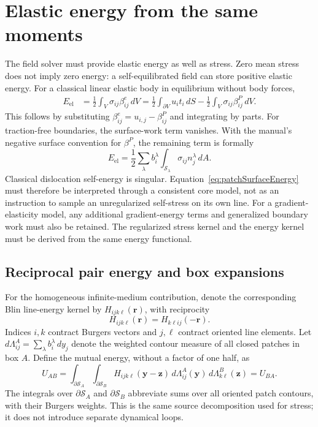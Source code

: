 \section{Elastic energy from the same moments}
\label{sec:patchMultipoleEnergy}
The field solver must provide elastic energy as well as stress. Zero mean stress does not imply zero energy: a self-equilibrated field can store positive elastic energy. For a classical linear elastic body in equilibrium without body forces,
\begin{align}
 E_{\mathrm{el}}&=\frac12\int_V\sigma_{ij}\beta^e_{ij}\,dV
 =\frac12\int_{\partial V}u_i t_i\,dS
 -\frac12\int_V\sigma_{ij}\beta^P_{ij}\,dV.
 \label{eq:patchEnergyWork}
\end{align}
This follows by substituting $\beta^e_{ij}=u_{i,j}-\beta^P_{ij}$ and integrating by parts. For traction-free boundaries, the surface-work term vanishes. With the manual's negative surface convention for $\beta^P$, the remaining term is formally
\begin{equation}
 E_{\mathrm{el}}=\frac12\sum_\lambda b_i^\lambda
 \int_{\mathcal S_\lambda}\sigma_{ij}n_j^\lambda\,dA.
 \label{eq:patchSurfaceEnergy}
\end{equation}
Classical dislocation self-energy is singular. Equation~\eqref{eq:patchSurfaceEnergy} must therefore be interpreted through a consistent core model, not as an instruction to sample an unregularized self-stress on its own line. For a gradient-elasticity model, any additional gradient-energy terms and generalized boundary work must also be retained. The regularized stress kernel and the energy kernel must be derived from the same energy functional.

\subsection{Reciprocal pair energy and box expansions}
For the homogeneous infinite-medium contribution, denote the corresponding Blin line-energy kernel by $H_{ij k\ell}(\bm r)$, with reciprocity
\begin{equation}
 H_{ij k\ell}(\bm r)=H_{k\ell ij}(-\bm r).
\end{equation}
Indices $i,k$ contract Burgers vectors and $j,\ell$ contract oriented line elements. Let $d\Lambda^A_{ij}=\sum_\lambda b_i^\lambda\,dy_j$ denote the weighted contour measure of all closed patches in box $A$. Define the mutual energy, without a factor of one half, as
\begin{equation}
 U_{AB}=\int_{\partial\mathcal S_A}\int_{\partial\mathcal S_B}
 H_{ij k\ell}(\bm y-\bm z)\,d\Lambda^A_{ij}(\bm y)
 \,d\Lambda^B_{k\ell}(\bm z)=U_{BA}.
 \label{eq:patchMutualEnergy}
\end{equation}
The integrals over $\partial\mathcal S_A$ and $\partial\mathcal S_B$ abbreviate sums over all oriented patch contours, with their Burgers weights. This is the same source decomposition used for stress; it does not introduce separate dynamical loops.

